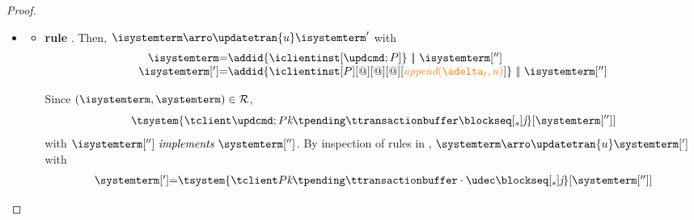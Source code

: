 \begin{proof}
\begin{itemize}
   
	
   \item%
   
		
			
			\begin{itemize}
\item {\bf rule }. Then, $\isystemterm  \arroi{\updatetran{u}} \isystemterm '$ with 
				\[\begin{array}{r@{=}l}
					\isystemterm & \addid{\iclientinst[\tupdateins]} \ \bigpar \ \isystemterm['']
					\\
					\isystemterm['] & \addid{\iclientinst[P][@][@][@][\iappend{\transactionbuffer}{u}]} \ \bigpar \   \isystemterm['']	
				  \end{array}
				\]
				
				Since $(\isystemterm,\systemterm)\in \mathcal{R}$,
				\[ \tsystem{\tclienti{\tupdateins}{\tknown}{\tpending}{\ttransactionbuffer}{\tsent}{\treceivebuffer}}[{\systemterm['']}] \]
				with $\implements{\isystemterm['']}{\systemterm['']}$. By inspection of rules in \figref{}, 
				$\systemterm \arroi{\updatetran{u}} \systemterm[']$ with
				\[\begin{array}{r@{=}l}
						\systemterm['] & \tsystem{\tclienti{\tprogram}{\tknown}{\tpending}{\ttransactionbuffer \cdot \tupdate}{\tsent}{\treceivebuffer}}[{\systemterm['']}]	
				  \end{array}		
				\]
				

\end{itemize}
\end{itemize}
\end{proof}
